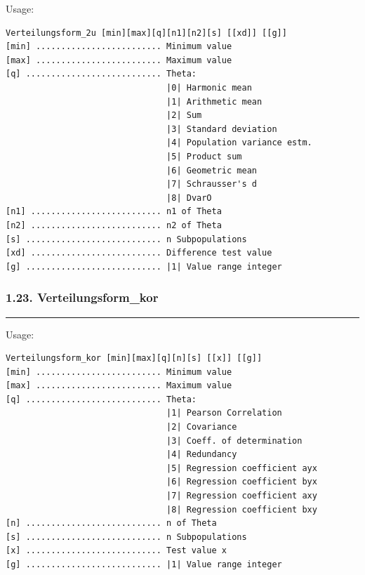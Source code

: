 \documentclass[
]{article}
\begin{document}
Usage:

\begin{verbatim}
Verteilungsform_2u [min][max][q][n1][n2][s] [[xd]] [[g]]
[min] ......................... Minimum value
[max] ......................... Maximum value
[q] ........................... Theta:
                                |0| Harmonic mean
                                |1| Arithmetic mean
                                |2| Sum
                                |3| Standard deviation 
                                |4| Population variance estm.
                                |5| Product sum 
                                |6| Geometric mean
                                |7| Schrausser's d
                                |8| DvarO
[n1] .......................... n1 of Theta
[n2] .......................... n2 of Theta
[s] ........................... n Subpopulations
[xd] .......................... Difference test value
[g] ........................... |1| Value range integer
\end{verbatim}

\hypertarget{verteilungsform_kor}{%
\subsubsection{1.23. Verteilungsform\_kor}\label{verteilungsform_kor}}

\begin{center}\rule{0.5\linewidth}{0.5pt}\end{center}

Usage:

\begin{verbatim}
Verteilungsform_kor [min][max][q][n][s] [[x]] [[g]]
[min] ......................... Minimum value
[max] ......................... Maximum value
[q] ........................... Theta:
                                |1| Pearson Correlation
                                |2| Covariance
                                |3| Coeff. of determination
                                |4| Redundancy
                                |5| Regression coefficient ayx
                                |6| Regression coefficient byx
                                |7| Regression coefficient axy
                                |8| Regression coefficient bxy
[n] ........................... n of Theta
[s] ........................... n Subpopulations
[x] ........................... Test value x
[g] ........................... |1| Value range integer
\end{verbatim}
\end{document}
